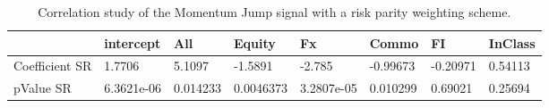 \begin{table}[H]
\centering
\begin{tabular}{llllllll}
& intercept & All & Equity & Fx & Commo & FI & InClass \\ 
\hline 
Coefficient SR & 1.7706 & 5.1097 & -1.5891 & -2.785 & -0.99673 & -0.20971 & 0.54113 \\ 
pValue SR & 6.3621e-06 & 0.014233 & 0.0046373 & 3.2807e-05 & 0.010299 & 0.69021 & 0.25694 \\ 
\hline
\end{tabular}
\caption{Correlation study of the Momentum Jump signal with a risk parity weighting scheme.}
\label{MOMJUMPRP_CORR}
\end{table}